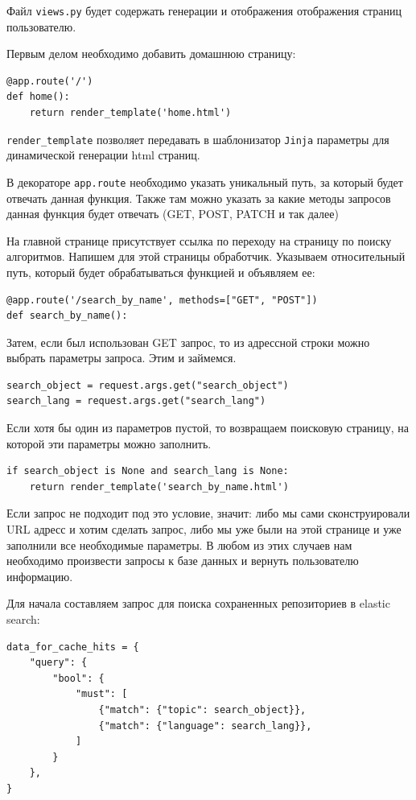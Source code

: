 Файл \verb|views.py| будет содержать генерации и отображения отображения страниц
пользователю.

Первым делом необходимо добавить домашнюю страницу:
\begin{verbatim}
@app.route('/')
def home():
    return render_template('home.html')
\end{verbatim}

\verb|render_template| позволяет передавать в шаблонизатор \verb|Jinja|
параметры для динамической генерации html страниц.

В декораторе \verb|app.route| необходимо указать уникальный путь, за который
будет отвечать данная функция. Также там можно указать за какие методы запросов
данная функция будет отвечать (GET, POST, PATCH и так далее)

На главной странице присутствует ссылка по переходу на страницу по поиску
алгоритмов. Напишем для этой страницы обработчик. Указываем относительный путь,
который будет обрабатываться функцией и объявляем ее:
\begin{verbatim}
@app.route('/search_by_name', methods=["GET", "POST"])
def search_by_name():
\end{verbatim}

Затем, если был использован GET запрос, то из адрессной строки можно выбрать
параметры запроса. Этим и займемся. 
\begin{verbatim}
search_object = request.args.get("search_object")
search_lang = request.args.get("search_lang")
\end{verbatim}

Если хотя бы один из параметров пустой, то возвращаем поисковую страницу, на
которой эти параметры можно заполнить.
\begin{verbatim}
if search_object is None and search_lang is None:
    return render_template('search_by_name.html')
\end{verbatim}

Если запрос не подходит под это условие, значит: либо мы сами сконструировали
URL адресс и хотим сделать запрос, либо мы уже были на этой странице и уже
заполнили все необходимые параметры. В любом из этих случаев нам необходимо
произвести запросы к базе данных и вернуть пользователю информацию.

Для начала составляем запрос для поиска сохраненных репозиториев в elastic search:
\begin{verbatim}
data_for_cache_hits = {
    "query": {
        "bool": {
            "must": [
                {"match": {"topic": search_object}},
                {"match": {"language": search_lang}},
            ]
        }
    },
}
\end{verbatim}

